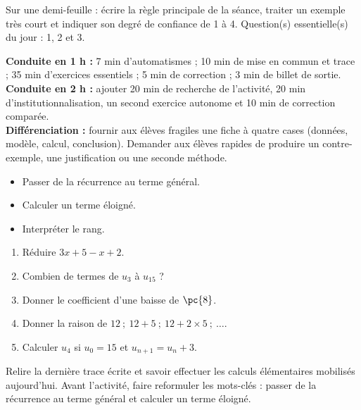     \begin{exitticket}[3 minutes]Sur une demi-feuille : écrire la règle principale de la séance, traiter un exemple très court et indiquer son degré de confiance de 1 à 4. Question(s) essentielle(s) du jour : 1, 2 et 3.\end{exitticket}

    \ifmxteacher
    \begin{method}
    \textbf{Conduite en 1 h :} 7 min d'automatismes ; 10 min de mise en commun et trace ; 35 min d'exercices essentiels ; 5 min de correction ; 3 min de billet de sortie.\\
    \textbf{Conduite en 2 h :} ajouter 20 min de recherche de l'activité, 20 min d'institutionnalisation, un second exercice autonome et 10 min de correction comparée.\\
    \textbf{Différenciation :} fournir aux élèves fragiles une fiche à quatre cases (données, modèle, calcul, conclusion). Demander aux élèves rapides de produire un contre-exemple, une justification ou une seconde méthode.
    \end{method}
    \fi
{}
\begin{objectives}\begin{itemize}\item Passer de la récurrence au terme général.\item Calculer un terme éloigné.\item Interpréter le rang.\end{itemize}\end{objectives}
\begin{fluency}\begin{enumerate}\item Réduire $3x+5-x+2$. \item Combien de termes de $u_3$ à $u_{15}$ ? \item Donner le coefficient d'une baisse de $\pc{8}$. \item Donner la raison de $12\ ;\ 12+5\ ;\ 12+2\times5\ ;\ \ldots$. \item Calculer $u_4$ si $u_0=15$ et $u_{n+1}=u_n+3$. \end{enumerate}\end{fluency}
\begin{prerequisites}Relire la dernière trace écrite et savoir effectuer les calculs élémentaires mobilisés aujourd'hui. Avant l'activité, faire reformuler les mots-clés : passer de la récurrence au terme général et calculer un terme éloigné.\end{prerequisites}

